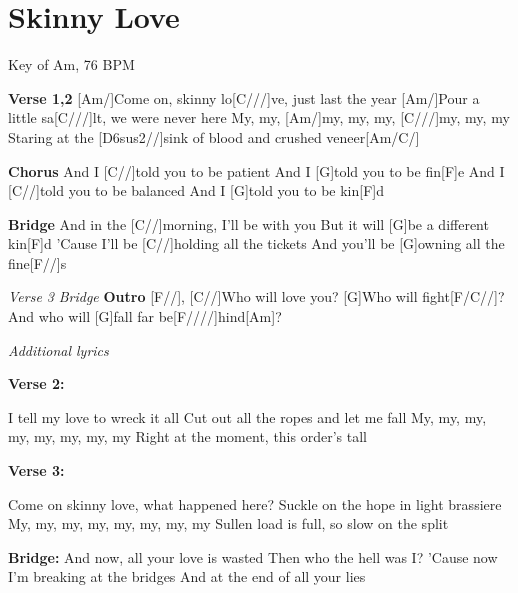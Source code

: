 \documentclass{article}
\begin{document}
\section{Skinny Love}
{\tiny
Key of Am, 76 BPM
}
\begin{guitar}
\begin{multicols}{2}

\textbf{Verse 1,2}
[Am/]Come on, skinny lo[C///]ve, just last the year
[Am/]Pour a little sa[C///]lt, we were never here
My, my, [Am/]my, my, my, [C///]my,  my, my
Staring at the [D6sus2//]sink of blood and crushed veneer[Am/C/]

\textbf{Chorus}
And I [C//]told you to be patient
And I [G]told you to be fin[F]e
And I [C//]told you to be balanced
And I [G]told you to be kin[F]d

\textbf{Bridge}
And in the [C//]morning, I'll be with you
But it will [G]be a different kin[F]d
'Cause I'll be [C//]holding all the tickets
And you'll be [G]owning all the fine[F//]s

\textit{Verse 3}
\textit{Bridge}
\textbf{Outro}
[F//],
[C//]Who will love you?
[G]Who will fight[F/C//]?
And who will [G]fall
far be[F////]hind[Am]?

\end{multicols}

\begin{center}
\textit{Additional lyrics}
\end{center}
\begin{multicols}{2}
\footnotesize
\raggedright
\textbf{Verse 2:}

I tell my love to wreck it all
Cut out all the ropes and let me fall
My, my, my, my, my, my, my, my
Right at the moment, this order's tall

\textbf{Verse 3:}

Come on skinny love, what happened here?
Suckle on the hope in light brassiere
My, my, my, my, my, my, my, my
Sullen load is full, so slow on the split

\columnbreak

\textbf{Bridge:}
And now, all your love is wasted
Then who the hell was I?
'Cause now I'm breaking at the bridges
And at the end of all your lies
\end{multicols}
\end{guitar}
\end{document}

